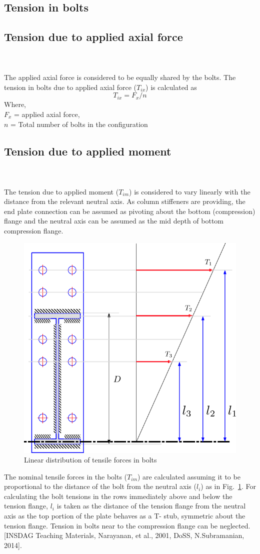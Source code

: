 \documentclass[11.5pt,a4paper,oneside]{report}
\begin{document}
\begin{Form}
\section{Tension in bolts}
\subsection{Tension due to applied axial force}
\quad \quad[Reference: Cl. 10.11.2.1(a), IS 800:2007] \\ \\
The applied axial force is considered to be equally shared by the bolts. The tension in bolts due to applied axial force ($T_{ix}$) is calculated as 
\begin{equation}
T_{ix} = F_x / n  
\end{equation}
Where, \\
\noindent $F_x$ = applied axial force, \\
\noindent $n$ = Total number of bolts in the configuration \\
\subsection{Tension due to applied moment}
\quad \quad[Reference: Cl. 10.11.2.1(b), IS 800:2007] \\ \\
The tension due to applied moment ($T_{im}$) is considered to vary linearly with the distance from the relevant neutral axis. As column stiffeners are providing, the end plate connection can be assumed as pivoting about the bottom (compression) flange and the neutral axis can be assumed as the mid depth of bottom compression flange.

\begin{figure}[h]
	\centering
	\includegraphics[width=0.3\linewidth]{tension.png}
	\caption{Linear distribution of tensile forces in bolts}
	\label{fig: tensile_distribution}
\end{figure}

The nominal tensile forces in the bolts ($T_{im}$) are calculated assuming it to be proportional to the distance of the bolt from the neutral axis ($l_i$) as in Fig.~\ref{fig: tensile_distribution}. For calculating the bolt tensions in the rows immediately above and below the tension flange, $l_i$ is taken as the distance of the tension flange from the neutral axis as the top portion of the plate behaves as a T- stub, symmetric about the tension flange. Tension in bolts near to the compression flange can be neglected. [INSDAG Teaching Materials, Narayanan, et al., 2001, DoSS, N.Subramanian, 2014]. 


\end{Form}
\end{document}
